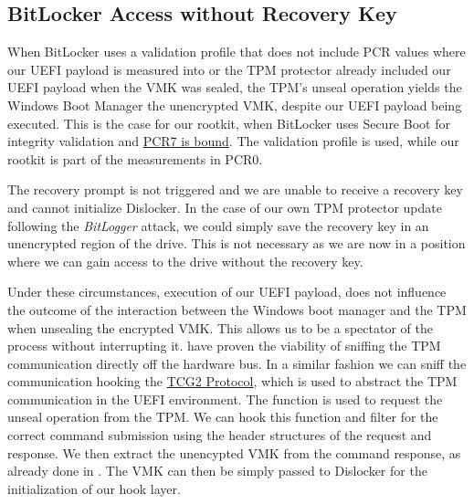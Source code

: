 \subsection{BitLocker Access without Recovery Key}
\label{sec:attacks:bitlocker:bitlocker-access-without-recovery-key}

When BitLocker uses a validation profile that does not include \ac{PCR} values where our \ac{UEFI} payload is measured into or the \ac{TPM} protector already included our \ac{UEFI} payload when the \ac{VMK} was sealed, the \ac{TPM}'s unseal operation yields the Windows Boot Manager the unencrypted \ac{VMK}, despite our \ac{UEFI} payload being executed.
This is the case for our rootkit, when BitLocker uses Secure Boot for integrity validation and \hyperlink{pcr7-binding}{\ac{PCR}7 is bound}.
The validation profile \hyperref[tab:pcr-usage]{} is used, while our rootkit is part of the measurements in \ac{PCR}0.

The recovery prompt is not triggered and we are unable to receive a recovery key and cannot initialize Dislocker.
In the case of our own \ac{TPM} protector update following the \emph{BitLogger} attack, we could simply save the recovery key in an unencrypted region of the drive.
This is not necessary as we are now in a position where we can gain access to the drive without the recovery key.

Under these circumstances, execution of our \ac{UEFI} payload, does not influence the outcome of the interaction between the Windows boot manager and the \ac{TPM} when unsealing the encrypted \ac{VMK}.
This allows us to be a spectator of the process without interrupting it.
\cite{tpm-spi-sniffing, tpm-lpc-sniffing} have proven the viability of sniffing the \ac{TPM} communication directly off the hardware bus.
In a similar fashion we can sniff the communication hooking the \hyperref[lst:tcg2-protocol]{\ac{TCG}2 Protocol}, which is used to abstract the \ac{TPM} communication in the \ac{UEFI} environment.
The  function is used to request the unseal operation from the \ac{TPM}.
We can hook this function and filter for the correct command submission using the header structures of the request and response.
We then extract the unencypted \ac{VMK} from the command response, as already done in \cite{tpm-lpc-sniffing}.
The \ac{VMK} can then be simply passed to Dislocker for the initialization of our hook layer.